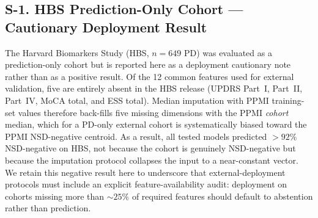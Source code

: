 \subsection*{S-1. HBS Prediction-Only Cohort --- Cautionary Deployment Result}
\label{p1:sec:supp:hbs}

The Harvard Biomarkers Study (HBS, $n{=}649$ PD) was evaluated as a prediction-only cohort but is reported here as a deployment cautionary note rather than as a positive result. Of the 12 common features used for external validation, five are entirely absent in the HBS release (UPDRS Part~I, Part~II, Part~IV, MoCA total, and ESS total). Median imputation with PPMI training-set values therefore back-fills five missing dimensions with the PPMI \emph{cohort} median, which for a PD-only external cohort is systematically biased toward the PPMI NSD-negative centroid. As a result, all tested models predicted $>92\%$ NSD-negative on HBS, not because the cohort is genuinely NSD-negative but because the imputation protocol collapses the input to a near-constant vector. We retain this negative result here to underscore that external-deployment protocols must include an explicit feature-availability audit: deployment on cohorts missing more than ${\sim}25\%$ of required features should default to abstention rather than prediction.
